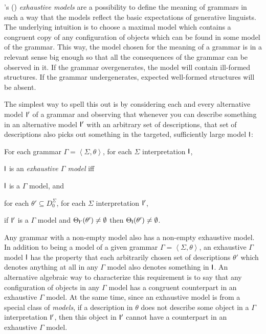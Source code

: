 \documentclass[output=paper
 	        ,biblatex
                ,babelshorthands
                ,newtxmath
                ,draftmode
                ,colorlinks, citecolor=brown
]{langscibook}
\begin{document}
{\citeauthor{King99a-u}'s (\citeyear{King99a-u}) \emph{exhaustive models} are a possibility to
define the meaning of grammars in such a way that the models reflect the
basic expectations of generative linguists. The underlying intuition
is to choose a maximal model which contains a congruent copy of any
configuration of objects which can be found in some model of the grammar.
This way, the model chosen for the meaning of a grammar is in a
relevant sense big enough so that all
the consequences of the grammar can be observed in it. If the grammar
overgenerates, the model will contain ill-formed structures. If the grammar
undergenerates, expected well-formed structures will be absent.

The simplest way to spell this out is by considering each and every
alternative model $\mathsf{I}'$ of a grammar and observing that whenever
you can describe something in an alternative model $\mathsf{I}'$ with an
arbitrary set of descriptions, that set of descriptions also picks out
something in the targeted, sufficiently large model $\mathsf{I}$:

\begin{mydef}\label{def-exhaustive-models}
For each grammar $\Gamma = \left< \Sigma, \theta \right>$,
for each $\Sigma$ interpretation $\mathsf{I}$,

$\mathsf{I}$ is an \emph{exhaustive $\Gamma$ model} iff

$\mathsf{I}$ is a $\Gamma$ model, and

for each \(\theta' \subseteq D_0^{\Sigma}\),
for each $\Sigma$ interpretation $\mathsf{I}'$,

if $\mathsf{I}'$ is a $\Gamma$ model and \(\Theta_{\mathsf{I}'}(\theta') \not= \emptyset\)
then \(\Theta_{\mathsf{I}}(\theta') \not= \emptyset\).
\end{mydef}

Any grammar with a non-empty model also has a non-empty exhaustive
mod\-el.
In addition to being a model of a given grammar $\Gamma = \left<
\Sigma, \theta \right>$, an exhaustive $\Gamma$ model $\mathsf{I}$ has the
property that each arbitrarily chosen set of descriptions $\theta'$
which denotes anything at all in any $\Gamma$ model also denotes
something in $\mathsf{I}$. An alternative algebraic way to characterize
this requirement is to say that any configuration of objects in any
$\Gamma$ model has a congruent counterpart in an exhaustive $\Gamma$
model. At the same time, since an exhaustive model is from a special class
of \emph{models}, if a description in $\theta$ does not describe some object in
a $\Gamma$ interpretation $\mathsf{I}'$, then this object in $\mathsf{I}'$ cannot
have a counterpart in an exhaustive $\Gamma$ model.

}
\end{document}
